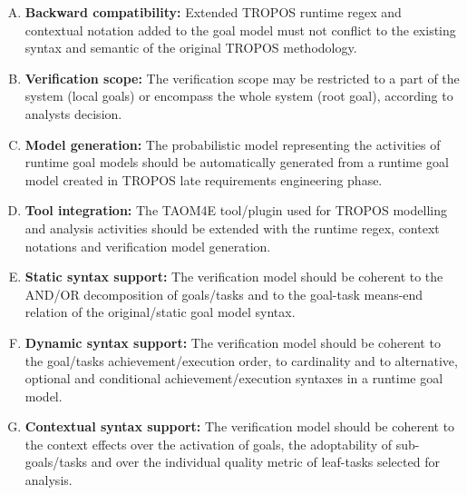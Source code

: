 \begin{enumerate}[R.1]

\item \textbf{Backward compatibility:} Extended TROPOS runtime regex and contextual notation added to the goal model must not conflict to the existing syntax and semantic of the original TROPOS methodology.


\item \textbf{Verification scope:} The verification scope may be restricted to a part of the system (local goals) or encompass the whole system (root goal), according to analysts decision.
\medskip

\item \textbf{Model generation:} The probabilistic model representing the activities of runtime goal models should be automatically generated from a runtime goal model created in TROPOS late requirements engineering phase.
\medskip

\item \textbf{Tool integration:} The TAOM4E tool/plugin used for TROPOS modelling and analysis activities should be extended with the runtime regex, context notations and verification model generation.
\medskip

\item \textbf{Static syntax support:} The verification model should be coherent to the AND/OR decomposition of goals/tasks and to the goal-task means-end relation of the original/static goal model syntax.
\medskip

\item \textbf{Dynamic syntax support:} The verification model should be coherent to the goal/tasks achievement/execution order, to cardinality and to alternative, optional and conditional achievement/execution syntaxes in a runtime goal model.
\medskip

\item \textbf{Contextual syntax support:} The verification model should be coherent to the context effects over the activation of goals, the adoptability of sub-goals/tasks and over the individual quality metric of leaf-tasks selected for analysis. 

\end{enumerate}
